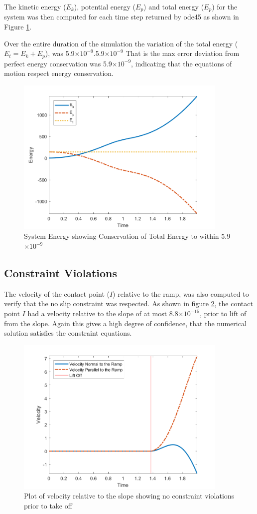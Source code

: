 \documentclass[12pt]{article}
\providecommand{\e}[1]{\ensuremath{\times 10^{#1}}}
\let\Oldsubsection\subsection
\renewcommand{\subsection}{\FloatBarrier\Oldsubsection}
\begin{document}
The kinetic energy ($E_k$), potential energy ($E_p$) and total energy ($E_p$) for the system was then computed for each time step returned by ode45 as shown in Figure \ref{fig:energy_con}.

Over the entire duration of the simulation the variation of the total energy ($E_t = E_k + E_p$), was 5.9\e{-9}.5.9\e{-9}
That is the max error deviation from perfect energy conservation was 5.9\e{-9}, indicating that the equations of motion respect energy conservation.
\begin{figure}[h]
\centering
\includegraphics[height=3in]{img/energy_con.png}
\caption{System Energy showing Conservation of Total Energy to within 5.9\e{-9}}
\label{fig:energy_con}
\end{figure}

\subsection{Constraint Violations}
The velocity of the contact point ($I$) relative to the ramp, was also computed to verify that the no slip constraint was respected.
As shown in figure \ref{fig:constraint_check}, the contact point $I$ had a velocity relative to the slope of at most $8.8\e{-15}$, prior to lift of from the slope.
Again this gives a high degree of confidence, that the numerical solution satisfies the constraint equations.

\begin{figure}[h]
\centering
\includegraphics[height=3in]{img/constraint_check.png}
\caption{Plot of velocity relative to the slope showing no constraint violations prior to take off} 
\label{fig:constraint_check}
\end{figure}
\end{document}
